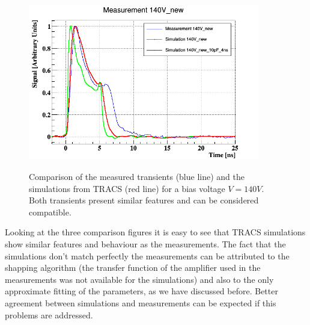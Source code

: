 \begin{figure}[H]
	\centering
	\includegraphics[width=0.9\textwidth]{140V.png}
	\label{fig:mues2}
	\caption{Comparison of the measured transients (blue line) and the simulations from TRACS (red line) for a bias voltage $V = 140V$. Both transients present similar features and can be considered compatible.}
\end{figure}

Looking at the three comparison figures it is easy to see that TRACS simulations show similar features and behaviour as the measurements. The fact that the simulations don't match perfectly the measurements can be attributed to the shapping algorithm (the transfer function of the amplifier used in the measurements was not available for the simulations) and also to the only approximate fitting of the parameters, as we have discussed before. Better agreement between simulations and measurements can be expected if this problems are addressed.

